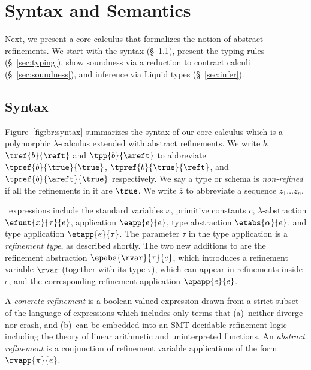 \section{Syntax and Semantics}\label{sec:check}

Next, we present a core calculus \corelan that formalizes the notion
of abstract refinements. We start with the syntax (\S~\ref{sec:syntax}),
present the typing rules (\S~\ref{sec:typing}), show soundness 
via a reduction to contract calculi \cite{Knowles10,Greenberg11}
(\S~\ref{sec:soundness}), and inference via Liquid types (\S~\ref{sec:infer}).

\subsection{Syntax}\label{sec:syntax}

Figure~\ref{fig:br:syntax} summarizes the syntax of our core 
calculus \corelan which is a polymorphic $\lambda$-calculus 
extended with abstract refinements. 
%
We write 
$b$, 
$\tref{b}{\reft}$ and 
$\tpp{b}{\areft}$ 
to abbreviate 
$\tpref{b}{\true}{\true}$, 
$\tpref{b}{\true}{\reft}$, and
$\tpref{b}{\areft}{\true}$ respectively. 
We say a type or schema is \emph{non-refined} if all the 
refinements in it are $\true$. We write $\overline{z}$ 
to abbreviate a sequence $z_1 \ldots z_n$.


\corelan\ expressions include the standard variables $x$, 
primitive constants $c$, $\lambda$-abstraction $\efunt{x}{\tau}{e}$,
application $\eapp{e}{e}$, type abstraction $\etabs{\alpha}{e}$,
and type application $\etapp{e}{\tau}$. The parameter $\tau$ in 
the type application is a \emph{refinement type}, as described shortly.
The two new additions to \corelan are the refinement abstraction
$\epabs{\rvar}{\tau}{e}$, which introduces a refinement variable 
$\rvar$ (together with its type $\tau$), which can appear in refinements
inside $e$, and the corresponding refinement application $\epapp{e}{e}$.
%

A \emph{concrete refinement}  is a boolean valued expression  
drawn from a strict subset of the language of expressions which
includes only terms that 
(a)~neither diverge nor crash, and 
(b)~can be embedded into an SMT decidable refinement logic including 
the theory of linear arithmetic and uninterpreted functions.
%
An \emph{abstract refinement} \areft is a conjunction of refinement
variable applications of the form $\rvapp{\pi}{e}$.

